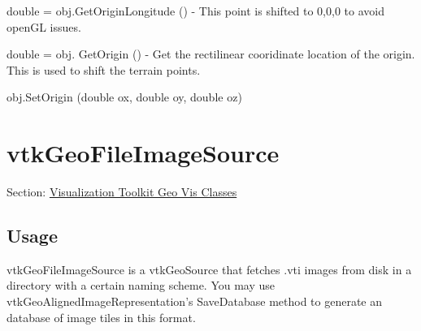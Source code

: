 \begin{DoxyItemize}
\item {\ttfamily double = obj.\-Get\-Origin\-Longitude ()} -\/ This point is shifted to 0,0,0 to avoid open\-G\-L issues.  
\item {\ttfamily double = obj. Get\-Origin ()} -\/ Get the rectilinear cooridinate location of the origin. This is used to shift the terrain points.  
\item {\ttfamily obj.\-Set\-Origin (double ox, double oy, double oz)}  
\end{DoxyItemize}\hypertarget{vtkgeovis_vtkgeofileimagesource}{}\section{vtk\-Geo\-File\-Image\-Source}\label{vtkgeovis_vtkgeofileimagesource}
Section\-: \hyperlink{sec_vtkgeovis}{Visualization Toolkit Geo Vis Classes} \hypertarget{vtkwidgets_vtkxyplotwidget_Usage}{}\subsection{Usage}\label{vtkwidgets_vtkxyplotwidget_Usage}
vtk\-Geo\-File\-Image\-Source is a vtk\-Geo\-Source that fetches .vti images from disk in a directory with a certain naming scheme. You may use vtk\-Geo\-Aligned\-Image\-Representation's Save\-Database method to generate an database of image tiles in this format.

